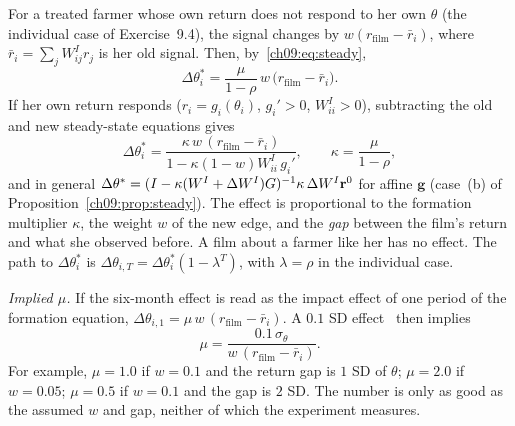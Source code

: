 \documentclass[../solutions_manual.tex]{subfiles}
\begin{document}
 For a treated farmer whose own return does not respond to her own $\theta$ (the individual case of Exercise~9.4), the signal changes by $w(r_{\text{film}} - \bar r_i)$, where $\bar r_i = \sum_jW^I_{ij}r_j$ is her old signal. Then, by~\eqref{ch09:eq:steady},
\[
\Delta\theta_i^* = \frac{\mu}{1-\rho}\,w\,\bigl(r_{\text{film}} - \bar r_i\bigr).
\]
If her own return responds ($r_i = g_i(\theta_i)$, $g_i' > 0$, $W^I_{ii} > 0$), subtracting the old and new steady-state equations gives
\[
\Delta\theta_i^* = \frac{\kappa\,w\,(r_{\text{film}} - \bar r_i)}{1 - \kappa(1-w)W^I_{ii}\,g_i'}, \qquad \kappa = \frac{\mu}{1-\rho},
\]
and in general $\Delta\theta^* = (I - \kappa(W^I + \Delta W^I)G)^{-1}\kappa\,\Delta W^I\mathbf r^0$ for affine $\mathbf g$ (case~(b) of Proposition~\ref{ch09:prop:steady}). The effect is proportional to the formation multiplier $\kappa$, the weight $w$ of the new edge, and the \emph{gap} between the film's return and what she observed before. A film about a farmer like her has no effect. The path to $\Delta\theta_i^*$ is $\Delta\theta_{i,T} = \Delta\theta_i^*(1 - \lambda^T)$, with $\lambda = \rho$ in the individual case.

 \emph{Implied $\mu$.} If the six-month effect is read as the impact effect of one period of the formation equation, $\Delta\theta_{i,1} = \mu\,w\,(r_{\text{film}} - \bar r_i)$. A $0.1$ SD effect \illustrative\ then implies
\[
\mu = \frac{0.1\,\sigma_\theta}{w\,(r_{\text{film}} - \bar r_i)} .
\]
For example, $\mu = 1.0$ if $w = 0.1$ and the return gap is $1$ SD of $\theta$; $\mu = 2.0$ if $w = 0.05$; $\mu = 0.5$ if $w = 0.1$ and the gap is $2$ SD. The number is only as good as the assumed $w$ and gap, neither of which the experiment measures.
\end{document}
